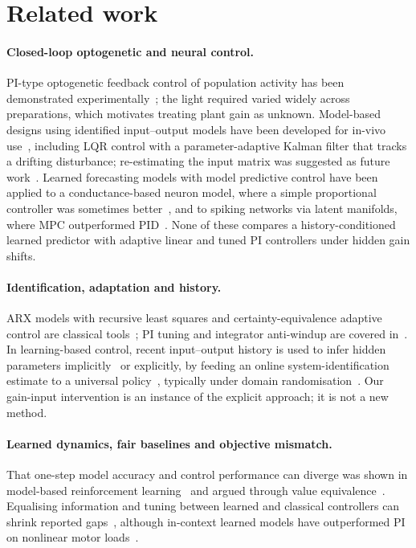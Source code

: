\documentclass[11pt]{article}
\begin{document}
\section{Related work}
\paragraph{Closed-loop optogenetic and neural control.} PI-type optogenetic feedback control of population activity has been demonstrated experimentally~\cite{newman2015}; the light required varied widely across preparations, which motivates treating plant gain as unknown. Model-based designs using identified input--output models have been developed for in-vivo use~\cite{bolus2018,grosenick2015}, including LQR control with a parameter-adaptive Kalman filter that tracks a drifting disturbance; re-estimating the input matrix was suggested as future work~\cite{bolus2021}. Learned forecasting models with model predictive control have been applied to a conductance-based neuron model, where a simple proportional controller was sometimes better~\cite{fehrman2023}, and to spiking networks via latent manifolds, where MPC outperformed PID~\cite{fehrman2024}. None of these compares a history-conditioned learned predictor with adaptive linear and tuned PI controllers under hidden gain shifts.

\paragraph{Identification, adaptation and history.} ARX models with recursive least squares and certainty-equivalence adaptive control are classical tools~\cite{astrom1995adaptive,ljung1999}; PI tuning and integrator anti-windup are covered in~\cite{astrom1995pid}. In learning-based control, recent input--output history is used to infer hidden parameters implicitly~\cite{kumar2021rma} or explicitly, by feeding an online system-identification estimate to a universal policy~\cite{yu2017}, typically under domain randomisation~\cite{tobin2017}. Our gain-input intervention is an instance of the explicit approach; it is not a new method.

\paragraph{Learned dynamics, fair baselines and objective mismatch.} That one-step model accuracy and control performance can diverge was shown in model-based reinforcement learning~\cite{lambert2020} and argued through value equivalence~\cite{grimm2020}. Equalising information and tuning between learned and classical controllers can shrink reported gaps~\cite{kunapuli2025}, although in-context learned models have outperformed PI on nonlinear motor loads~\cite{jian2026}.
\end{document}
